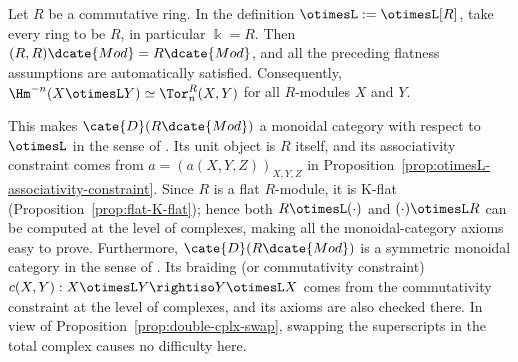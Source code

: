 \begin{example}\label{eg:commutative-otimesL}
	Let $R$ be a commutative ring. In the definition
	$\otimesL:=\otimesL[R]$, take every ring to be $R$, in particular
	$\Bbbk=R$. Then $(R,R)\dcate{Mod}=R\dcate{Mod}$, and all the preceding
	flatness assumptions are automatically satisfied. Consequently,
	$\Hm^{-n}(X\otimesL Y)\simeq\Tor^R_n(X,Y)$ for all $R$-modules $X$ and
	$Y$.

	This makes $\cate{D}(R\dcate{Mod})$ a monoidal category with respect to
	$\otimesL$ in the sense of \cite[\S 3.1]{Li1}. Its unit object is $R$
	itself, and its associativity constraint comes from
	$a=(a(X,Y,Z))_{X,Y,Z}$ in
	Proposition~\ref{prop:otimesL-associativity-constraint}. Since $R$ is a flat
	$R$-module, it is K-flat (Proposition~\ref{prop:flat-K-flat}); hence both
	$R\otimesL(\cdot)$ and $(\cdot)\otimesL R$ can be computed at the level of
	complexes, making all the monoidal-category axioms easy to prove.
	Furthermore, $\cate{D}(R\dcate{Mod})$ is a symmetric monoidal category in
	the sense of \cite[Definition 3.3.1]{Li1}. Its braiding (or commutativity
	constraint) $c(X,Y):X\otimesL Y\rightiso Y\otimesL X$ comes from the
	commutativity constraint at the level of complexes, and its axioms are also
	checked there. In view of Proposition~\ref{prop:double-cplx-swap}, swapping
	the superscripts in the total complex causes no difficulty here.
\end{example}

